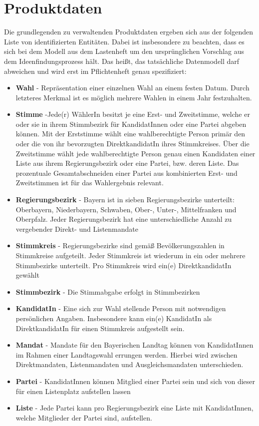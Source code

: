 \documentclass[a4paper,12pt]{article}
\begin{document}
\section{Produktdaten}
Die grundlegenden zu verwaltenden Produktdaten ergeben sich aus der folgenden Liste von
identifizierten Entitäten. Dabei ist insbesondere zu beachten, dass es sich bei dem Modell
aus dem Lastenheft um den ursprünglichen Vorschlag aus dem Ideenfindungsprozess hält. Das heißt,
das tatsächliche Datenmodell darf abweichen und wird erst im Pflichtenheft genau spezifiziert:
\begin{itemize}
  \item \textbf{Wahl} - Repräsentation einer einzelnen Wahl an einem festen Datum. 
        Durch letzteres Merkmal ist es möglich mehrere Wahlen in einem Jahr festzuhalten.
  \item \textbf{Stimme} -Jede(r) WählerIn besitzt je eine Erst- und Zweitstimme, welche er oder sie in ihrem
  Stimmbezirk für KandidatInnen oder eine Partei abgeben können. Mit der Erststimme wählt eine wahlberechtigte Person
  primär den oder die von ihr bevorzugten DirektkandidatIn ihres Stimmkreises. Über die Zweitstimme wählt 
  jede wahlberechtigte Person genau einen Kandidaten einer Liste aus ihrem Regierungsbezirk oder eine Partei, bzw. deren Liste. 
  Das prozentuale Gesamtabschneiden einer Partei aus kombinierten Erst- und Zweitstimmen ist für das 
  Wahlergebnis relevant.
  \item \textbf{Regierungsbezirk} - Bayern ist in sieben Regierungsbezirke unterteilt: Oberbayern,
        Niederbayern, Schwaben, Ober-, Unter-, Mittelfranken und Oberpfalz. Jeder Regierungsbezirk
        hat eine unterschiedliche Anzahl zu vergebender Direkt- und Listenmandate
  \item \textbf{Stimmkreis} - Regierungsbezirke sind gemäß Bevölkerungszahlen in Stimmkreise aufgeteilt.
        Jeder Stimmkreis ist wiederum in ein oder mehrere Stimmbezirke unterteilt. Pro Stimmkreis wird ein(e)
        DirektkandidatIn gewählt
  \item \textbf{Stimmbezirk} - Die Stimmabgabe erfolgt in Stimmbezirken
  \item \textbf{KandidatIn} - Eine sich zur Wahl stellende Person mit notwendigen persönlichen Angaben. 
        Insbesondere kann ein(e) KandidatIn als DirektkandidatIn für einen Stimmkreis aufgestellt sein.
  \item \textbf{Mandat} - Mandate für den Bayerischen Landtag können von KandidatInnen im Rahmen einer Landtagswahl
        errungen werden. Hierbei wird zwischen Direktmandaten, Listenmandaten und Ausgleichsmandaten unterschieden.
  \item \textbf{Partei} - KandidatInnen können Mitglied einer Partei sein und sich von dieser für einen Listenplatz
        aufstellen lassen
  \item \textbf{Liste} - Jede Partei kann pro Regierungsbezirk eine Liste mit KandidatInnen, welche Mitglieder der 
        Partei sind, aufstellen.
\end{itemize}
\end{document}
